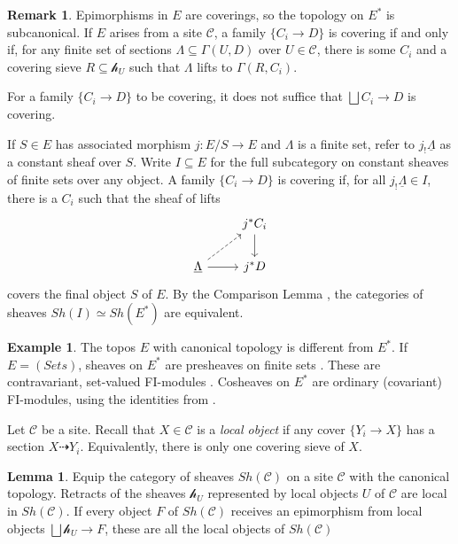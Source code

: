 \documentclass[11pt,reqno]{amsart}
\theoremstyle{definition}
\newtheorem{lemma}[theorem]{Lemma}
\newtheorem{example}[theorem]{Example}
\newtheorem{remark}[theorem]{Remark}
\newcommand{\hh}[1]{\mathcal{h}_{#1}}
\newcommand{\cal}[1]{\ensuremath{\mathcal{#1}}}
\newcommand{\Leo}[2][inline]{\todo[linecolor=purple,backgroundcolor=purple!25,bordercolor=purple,#1,shadow,author=Leo]{#2}} %
\begin{document}
\begin{remark}
Epimorphisms in $E$ are coverings, so the topology on $E^*$ is subcanonical. If $E$ arises from a site $\cal C$, a family $\{C_i \to D\}$ is covering if and only if, for any finite set of sections $\Lambda \subseteq \Gamma(U, D)$ over $U \in \cal C$, there is some $C_i$ and a covering sieve $R \subseteq \hh{U}$ such that $\Lambda$ lifts to $\Gamma(R, C_i)$. 

For a family $\{C_i \to D\}$ to be covering, it does not suffice that $\bigsqcup C_i \to D$ is covering. 

If $S \in E$ has associated morphism $j : E/S \to E$ and $\Lambda$ is a finite set, refer to $j_! \underline{\Lambda}$ as a constant sheaf over $S$. Write $I \subseteq E$ for the full subcategory on constant sheaves of finite sets over any object.  A family $\{C_i \to D\}$ is covering if, for all $j_! \underline{\Lambda} \in I$, there is a $C_i$ such that the sheaf of lifts
\[\begin{tikzcd}
        &j^* C_i \ar[d]        \\
\underline{\Lambda} \ar[r] \ar[ur, dashed]         &j^* D 
\end{tikzcd}\]
covers the final object $S$ of $E$. By the Comparison Lemma \cite[Theorem III.4.1]{SGA4}, the categories of sheaves $Sh(I) \simeq Sh(E^*)$ are equivalent. 

\end{remark}



\begin{example}

The topos $E$ with canonical topology is different from $E^*$. If $E = (Sets)$, sheaves on $E^*$ are presheaves on finite sets \cite[Remark pg. 188]{wisealgs1}. These are contravariant, set-valued FI-modules \cite{FImodules}. Cosheaves on $E^*$ are ordinary (covariant) FI-modules, using the identities from \cite{nlab:cosheaf}. 


\end{example}



Let $\cal C$ be a site. Recall that $X \in \cal C$ is a \textit{local object} \cite[Definition 0.1]{gabberkellylocal} if any cover $\{Y_i \to X\}$ has a section $X \dashrightarrow Y_i$. Equivalently, there is only one covering sieve of $X$. 


\begin{lemma}
Equip the category of sheaves $Sh(\cal C)$ on a site $\cal C$ with the canonical topology. Retracts of the sheaves $\hh{U}$ represented by local objects $U$ of $\cal C$ are local in $Sh(\cal C)$. If every object $F$ of $Sh(\cal C)$ receives an epimorphism from local objects $\bigsqcup \hh{U} \to F$, these are all the local objects of $Sh(\cal C)$

\end{lemma}
\end{document}
